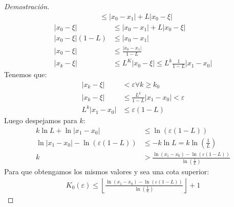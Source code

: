 \documentclass{article}
\begin{document}
\begin{proof}[Demostración]
\begin{equation}
\begin{split}
            &\leq \lvert x_{0}-x_{1} \rvert  +L\lvert x_{0}-\xi  \rvert
		\end{split}
	\end{equation}
	\begin{equation}
		\begin{split}
            \lvert x_{0}-\xi  \rvert &\leq \lvert x_{0}-x_{1} \rvert + L\lvert x_{0}-\xi  \rvert\\
            \lvert x_{0}-\xi \rvert (1-L) &\leq \lvert x_{0}-x_{1} \rvert \\ 
            \lvert x_{0}-\xi  \rvert &\leq \frac{\lvert x_{0}-x_{1} \rvert }{1-L}\\
            \lvert x_{k}-\xi  \rvert &\leq L^{K}\lvert x_{0}-\xi  \rvert \leq L^{k} \frac{1}{1-L}
            \lvert x_{1}-x_{0} \rvert   
        \end{split}
    \end{equation}
    Tenemos que:
    \begin{equation}
        \begin{split}
            \lvert x_{k}-\xi  \rvert &< \varepsilon \forall k \geq k_{0}\\
            \lvert x_{k}-\xi  \rvert&\leq \frac{L^{k}}{1-L}\lvert x_{1}-x_{0} \rvert<\varepsilon\\
			L^{k}\lvert x_{1}-x_{0} \rvert &\leq \varepsilon (1-L)
        \end{split}
    \end{equation}
    Luego despejamos para $k$:
    \begin{equation}
        \begin{split}
            k \ln L + \ln \lvert x_{1}-x_{0} \rvert &\leq \ln(\varepsilon (1-L))\\
            \ln \lvert x_{1}-x_{0} \rvert - \ln (\varepsilon (1-L)) &\leq -k \ln L = k \ln (\frac{1}{L})\\
			k &> \frac{\ln(x_{1}-x_{0})-\ln (\varepsilon (1-L))}{\ln (\frac{1}{L})}
        \end{split}
    \end{equation}
    Para que obtengamos los mismos valores y sea una cota superior:
    \begin{equation}
        \begin{split}
            K_{0}(\varepsilon ) \leq \left \lfloor{\frac{\ln(x_{1}-x_{0})-\ln (\varepsilon (1-L))}
            {\ln (\frac{1}{L})}}\right \rfloor +1
        \end{split}
    \end{equation}
	
\end{proof}
\end{document}
